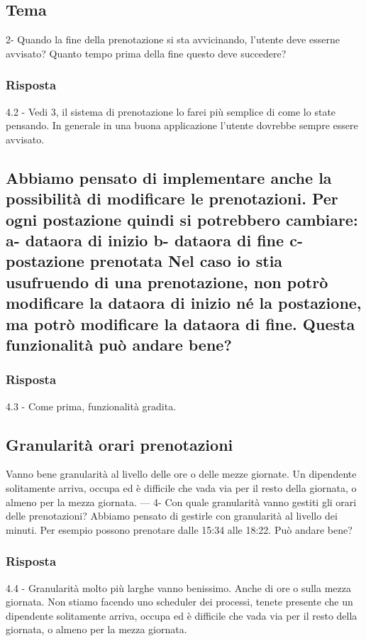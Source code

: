 \subsection*{Tema}
2- Quando la fine della prenotazione si sta avvicinando, l'utente deve esserne avvisato? Quanto tempo prima della fine questo deve succedere?
\subsubsection*{Risposta}
4.2 - Vedi 3, il sistema di prenotazione lo farei più semplice di come lo state pensando. In generale in una buona applicazione l'utente dovrebbe sempre essere avvisato.\\

\subsection*{Abbiamo pensato di implementare anche la possibilità di modificare le prenotazioni. Per ogni postazione quindi si potrebbero cambiare:
	a- dataora di inizio
	b- dataora di fine
	c- postazione prenotata
	Nel caso io stia usufruendo di una prenotazione, non potrò modificare la dataora di inizio né la postazione, ma potrò modificare la dataora di fine.
	Questa funzionalità può andare bene?}
\subsubsection*{Risposta}
4.3 - Come prima, funzionalità gradita.\\


\subsection*{Granularità orari prenotazioni}
Vanno bene granularità al livello delle ore o delle mezze giornate.
Un dipendente solitamente arriva, occupa ed è difficile che vada via per il resto della giornata, o almeno per la mezza giornata.
---
4- Con quale granularità vanno gestiti gli orari delle prenotazioni? Abbiamo pensato di gestirle con granularità al livello dei minuti. Per esempio possono prenotare dalle 15:34 alle 18:22. Può andare bene?
\subsubsection*{Risposta}
4.4 - Granularità molto più larghe vanno benissimo. Anche di ore o sulla mezza giornata. Non stiamo facendo uno scheduler dei processi, tenete presente che un dipendente solitamente arriva, occupa ed è difficile che vada via per il resto della giornata, o almeno per la mezza giornata.


